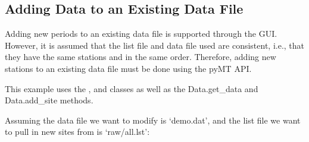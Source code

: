 \documentclass[letterpaper,10pt,english]{sphinxmanual}
\begin{document}
\begin{sphinxVerbatim}[commandchars=\\\{\}]
   
   
\end{sphinxVerbatim}


\subsection{Adding Data to an Existing Data File}
\label{\detokenize{content/examples/recipes:adding-data-to-an-existing-data-file}}
Adding new periods to an existing data file is supported through the {\hyperref[\detokenize{content/data_plot/main_window:data-plot}]{}} GUI. However, it is assumed that the list file and data file used are consistent, i.e., that they have the same stations and in the same order.
Therefore, adding new stations to an existing data file must be done using the pyMT API.

This example uses the {\hyperref[\detokenize{content/api_core/data_structures:data}]{}}, and {\hyperref[\detokenize{content/api_core/data_structures:rawdata}]{}} classes as well as the Data.get\_data and Data.add\_site methods.

Assuming the data file we want to modify is ‘demo.dat’, and the list file we want to pull in new sites from is ‘raw/all.lst’:
\end{document}
